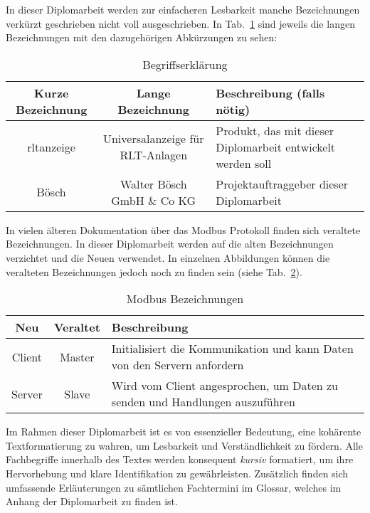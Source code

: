 In dieser Diplomarbeit werden zur einfacheren Lesbarkeit manche Bezeichnungen verkürzt geschrieben \bzw nicht voll ausgeschrieben. In Tab.~\ref{tab:begriffserklaerung} sind jeweils die langen Bezeichnungen mit den dazugehörigen Abkürzungen zu sehen:
\begin{table}[h]
	\caption{Begriffserklärung \label{tab:begriffserklaerung}}
	\begin{tabularx}{\textwidth}{@{}c|c|X@{}}
		\toprule
		\textbf{Kurze Bezeichnung} & \textbf{Lange Bezeichnung} & \textbf{Beschreibung (falls nötig)} \\
		\midrule
		\acs{rltanzeige} & Universalanzeige für RLT-Anlagen &  Produkt, das mit dieser Diplomarbeit entwickelt werden soll \\
		Bösch & Walter Bösch GmbH \& Co KG & Projektauftraggeber dieser Diplomarbeit \\
		\bottomrule
	\end{tabularx}
\end{table}


In vielen älteren Dokumentation über das Modbus Protokoll finden sich veraltete Bezeichnungen. In dieser Diplomarbeit werden auf die alten Bezeichnungen verzichtet und die Neuen verwendet. In einzelnen Abbildungen können die veralteten Bezeichnungen jedoch noch zu finden sein (siehe Tab.~\ref{tab:modbus_bezeichnung}). 
\begin{table}[h]
	\caption{Modbus Bezeichnungen \label{tab:modbus_bezeichnung}}
	\begin{tabularx}{\textwidth}{@{}c|c|X@{}}
		\toprule
		\textbf{Neu} & \textbf{Veraltet} & \textbf{Beschreibung} \\
		\midrule
		Client & Master & Initialisiert die Kommunikation und kann Daten von den Servern anfordern \\
		Server & Slave & Wird vom Client angesprochen, um Daten zu senden und Handlungen auszuführen \\
		\bottomrule
	\end{tabularx}
\end{table}

Im Rahmen dieser Diplomarbeit ist es von essenzieller Bedeutung, eine kohärente Textformatierung zu wahren, um Lesbarkeit und Verständlichkeit zu fördern. Alle Fachbegriffe innerhalb des Textes werden konsequent \textit{kursiv} formatiert, um ihre Hervorhebung und klare Identifikation zu gewährleisten. Zusätzlich finden sich umfassende Erläuterungen zu sämtlichen Fachtermini im Glossar, welches im Anhang der Diplomarbeit zu finden ist.




